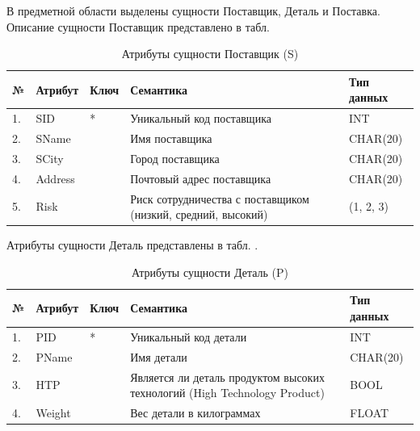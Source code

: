 В предметной области выделены сущности Поставщик, Деталь и Поставка. Описание сущности Поставщик представлено в табл. 
\begin{table}[h]
	\caption{\space Атрибуты сущности Поставщик (S)}
	\label{supplier}
	\begin{tabular}{|p{0.4cm}|p{2.5cm}|p{1.5cm}|p{6.3cm}|p{3.2cm}|}
		\hline
		\textbf{№} & \textbf{Атрибут} & \textbf{Ключ} & \textbf{Семантика} & \textbf{Тип данных} \\
		\hline
		1. & SID & * & Уникальный код поставщика & INT \\
		\hline
		2. & SName &  & Имя поставщика & CHAR(20) \\
		\hline
		3. & SCity & & Город поставщика & CHAR(20) \\
		\hline
		4. & Address & & Почтовый адрес поставщика & CHAR(20) \\
		\hline
		5. & Risk & & Риск сотрудничества с поставщиком (низкий, средний, высокий) & (1, 2, 3) \\
		\hline
	\end{tabular}
\end{table}

Атрибуты сущности Деталь представлены в табл. .
\begin{table}[h]
	\caption{\space Атрибуты сущности Деталь (P)}
	\label{part}
	\begin{tabular}{|p{0.4cm}|p{2.5cm}|p{1.5cm}|p{6.3cm}|p{3.2cm}|}
		\hline
		\textbf{№} & \textbf{Атрибут} & \textbf{Ключ} & \textbf{Семантика} & \textbf{Тип данных} \\
		\hline
		1. & PID & * & Уникальный код детали & INT \\
		\hline
		2. & PName &  & Имя детали & CHAR(20) \\
		\hline
		3. & HTP & & Является ли деталь продуктом высоких технологий (High Technology Product) & BOOL \\
		\hline
		4. & Weight & & Вес детали в килограммах & FLOAT \\
		\hline
	\end{tabular}
\end{table}

